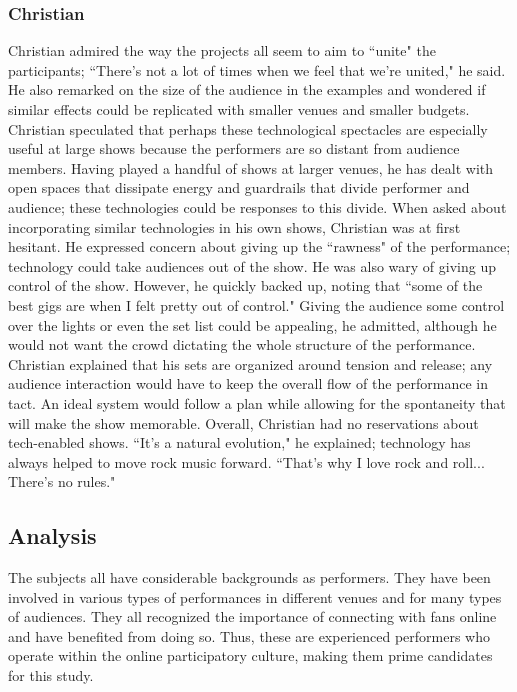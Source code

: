 \subsubsection{Christian}
Christian admired the way the projects all seem to aim to ``unite" the participants; ``There's not a lot of times when we feel that we're united," he said. He also remarked on the size of the audience in the examples and wondered if similar effects could be replicated with smaller venues and smaller budgets. Christian speculated that perhaps these technological spectacles are especially useful at large shows because the performers are so distant from audience members. Having played a handful of shows at larger venues, he has dealt with open spaces that dissipate energy and guardrails that divide performer and audience; these technologies could be responses to this divide. When asked about incorporating similar technologies in his own shows, Christian was at first hesitant. He expressed concern about giving up the ``rawness" of the performance; technology could take audiences out of the show. He was also wary of giving up control of the show. However, he quickly backed up, noting that ``some of the best gigs are when I felt pretty out of control." Giving the audience some control over the lights or even the set list could be appealing, he admitted, although he would not want the crowd dictating the whole structure of the performance. Christian explained that his sets are organized around tension and release; any audience interaction would have to keep the overall flow of the performance in tact. An ideal system would follow a plan while allowing for the spontaneity that will make the show memorable.  Overall, Christian had no reservations about tech-enabled shows. ``It's a natural evolution," he explained; technology has always helped to move rock music forward. ``That's why I love rock and roll... There's no rules." 

\subsection{Analysis}

The subjects all have considerable backgrounds as performers. They have been involved in various types of performances in different venues and for many types of audiences. They all recognized the importance of connecting with fans online and have benefited from doing so. Thus, these are experienced performers who operate within the online participatory culture, making them prime candidates for this study.

